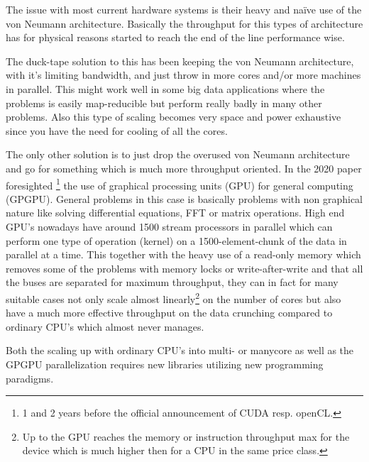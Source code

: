 \documentclass{article}
\begin{document}
    The issue with most current hardware systems is their heavy and 
    na\"{i}ve use of the von Neumann architecture. Basically the throughput 
    for this types of architecture has for physical reasons started to reach 
    the end of the line performance wise.

    The duck-tape solution to this has been keeping the von Neumann
    architecture, with it's limiting bandwidth, and just throw in more cores 
    and/or more machines in parallel. This might work well in some big data 
    applications where the problems is easily map-reducible but perform really 
    badly in many other problems.\cite{mapreduce} Also this type of scaling 
    becomes very space and power exhaustive since you have the need for
    cooling of all the cores. 

    The only other solution is to just drop the overused von Neumann 
    architecture and go for something which is much more throughput oriented. 
    In the 2020 paper\cite{ms2020} foresighted \footnote{1 and 2 years before 
    the official announcement of CUDA resp. openCL.} the use of graphical 
    processing units (GPU) for general computing (GPGPU). General problems in 
    this case is basically problems with non graphical nature like
    solving differential equations, FFT or matrix operations. 
    High end GPU's nowadays have around 1500 stream processors in parallel 
    which can perform one type of operation (kernel) on a 1500-element-chunk of 
    the data in parallel at a time. This together with the heavy use 
    of a read-only memory which removes some of the problems with memory locks
    or write-after-write and that all the buses are separated for
    maximum throughput, they can in fact for many suitable cases not only scale
    almost linearly\footnote{Up to the GPU reaches the memory or instruction
    throughput max for the device which is much higher then for a CPU in the
    same price class.} on the number of cores but also have a much more 
    effective throughput on the data crunching compared to ordinary CPU's 
    which almost never manages.

    Both the scaling up with ordinary CPU's into multi- or manycore as well as
    the GPGPU parallelization requires new libraries utilizing new programming 
    paradigms.
\end{document}
